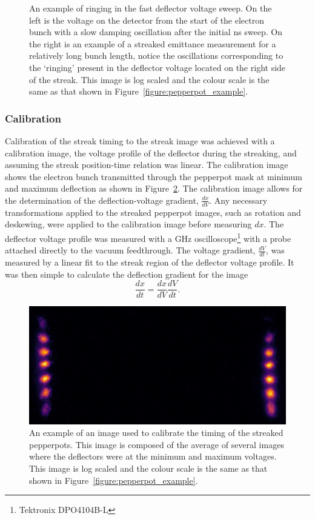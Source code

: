 \begin{figure}
    \center
    
    \caption[Streak deflector voltage oscillations.]{An example of ringing in the fast deflector voltage sweep. On the left is the voltage on the detector from the start of the electron bunch with a slow damping oscillation after the initial \unit[10]{ns} sweep. On the right is an example of a streaked emittance measurement for a relatively long bunch length, notice the oscillations corresponding to the `ringing' present in the deflector voltage located on the right side of the streak. This image is log scaled and the colour scale is the same as that shown in Figure~\ref{figure:pepperpot_example}.}
    \label{figure:ringing}
\end{figure}

\subsubsection{Calibration}
Calibration of the streak timing to the streak image was achieved with a calibration image, the voltage profile of the deflector during the streaking, and assuming the streak position-time relation was linear.
The calibration image shows the electron bunch transmitted through the pepperpot mask at minimum and maximum deflection as shown in Figure~\ref{figure:example_calibration}.
The calibration image allows for the determination of the deflection-voltage gradient, $\frac{dx}{dV}$.
Any necessary transformations applied to the streaked pepperpot images, such as rotation and deskewing, were applied to the calibration image before measuring $dx$.
The deflector voltage profile was measured with a \unit[1]{GHz} oscilloscope\footnote{Tektronix DPO4104B-L} with a probe attached directly to the vacuum feedthrough.
The voltage gradient, $\frac{dV}{dt}$, was measured by a linear fit to the streak region of the deflector voltage profile.
It was then simple to calculate the deflection gradient for the image
\begin{equation}
\frac{dx}{dt} = \frac{dx}{dV} \frac{dV}{dt}.
\end{equation}

\begin{figure}
    \center
    \includegraphics[width=0.5\linewidth]{part2/Figs/example_calibration.jpeg}
    \caption[Streaked pepperpot calibration image.]{An example of an image used to calibrate the timing of the streaked pepperpots.
    This image is composed of the average of several images where the deflectors were at the minimum and maximum voltages. This image is log scaled and the colour scale is the same as that shown in Figure~\ref{figure:pepperpot_example}.}
    \label{figure:example_calibration}
\end{figure}

